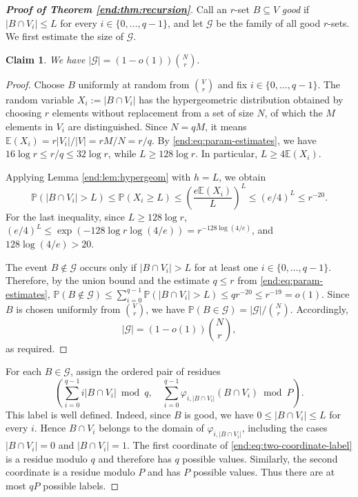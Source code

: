 \documentclass[12pt,a4paper]{article}
\numberwithin{equation}{section}
\newtheorem{claim}[theorem]{Claim}
\theoremstyle{definition}
\theoremstyle{remark}
\begin{document}
\begin{proof}[\bfseries{Proof of Theorem \ref{end:thm:recursion}}]
Call an $r$-set $B\subseteq V$ \emph{good} if $|B\cap V_i|\le L$ for every $i\in\{0,\ldots,q-1\}$, 
and let $\mathcal G$ be the family of all good $r$-sets.  
We first estimate the size of $\mathcal G$.  

\begin{claim}\label{claim:eq:good-count}
We have 
$ |\mathcal G|=(1-o(1))\binom Nr.$
\end{claim}

\begin{proof}
Choose $B$ uniformly at random from $\binom Vr$ and fix $i\in\{0,\ldots,q-1\}$.  The random variable $X_i:=|B\cap V_i|$ has the hypergeometric distribution obtained by choosing $r$ elements without replacement from a set of size $N$, of which the $M$ elements in $V_i$ are distinguished.  Since $N=qM$, it means
$\mathbb{E}( X_i)=r|V_i|/|V|=rM/N=r/q$.
By \eqref{end:eq:param-estimates}, we have $16\log r\le r/q\le32\log r$, while $L\ge128\log r$.  
In particular, $L\ge4\mathbb{E}(X_i)$.

Applying Lemma \ref{end:lem:hypergeom} with $h=L$, we obtain
$$ \mathbb{P}(|B\cap V_i|>L)
 \le\mathbb{P}(X_i\ge L)
 \le\left(\frac{e\mathbb{E}(X_i)}{L}\right)^L
 \le(e/4)^L
 \le r^{-20}.$$
For the last inequality, since $L\ge128\log r$,
$(e/4)^L\le\exp(-128\log r\log(4/e))=r^{-128\log(4/e)}$,
and $128\log(4/e)>20$.

The event $B\notin\mathcal G$ occurs only if $|B\cap V_i|>L$ for at least one $i\in\{0,\ldots,q-1\}$.  Therefore, by the union bound and the estimate $q\le r$ from \eqref{end:eq:param-estimates},
$\mathbb{P}(B\notin\mathcal G)\le\sum_{i=0}^{q-1}\mathbb{P}(|B\cap V_i|>L)\le qr^{-20}\le r^{-19}=o(1)$.
Since $B$ is chosen uniformly from $\binom Vr$, we have
$\mathbb{P}(B\in\mathcal G)=|\mathcal G|/\binom Nr$.
Accordingly,
\begin{equation*}
 |\mathcal G|=(1-o(1))\binom Nr,
\end{equation*}
as required.
\end{proof}


For each $B\in\mathcal G$, assign the ordered pair of residues
\begin{equation}\label{end:eq:two-coordinate-label}
 \left(
   \sum_{i=0}^{q-1}i|B\cap V_i|\bmod q,
   \quad
   \sum_{i=0}^{q-1}\varphi_{i,|B\cap V_i|}(B\cap V_i)\bmod P
 \right).
\end{equation}
This label is well defined.  Indeed, since $B$ is good, we have $0\le |B\cap V_i|\le L$ for every $i$.  Hence $B\cap V_i$ belongs to the domain of $\varphi_{i,|B\cap V_i|}$, including the cases $|B\cap V_i|=0$ and $|B\cap V_i|=1$.  The first coordinate of \eqref{end:eq:two-coordinate-label} is a residue modulo $q$ and therefore has $q$ possible values.  Similarly, the second coordinate is a residue modulo $P$ and has $P$ possible values.  Thus there are at most $qP$ possible labels.


\end{proof}
\end{document}
